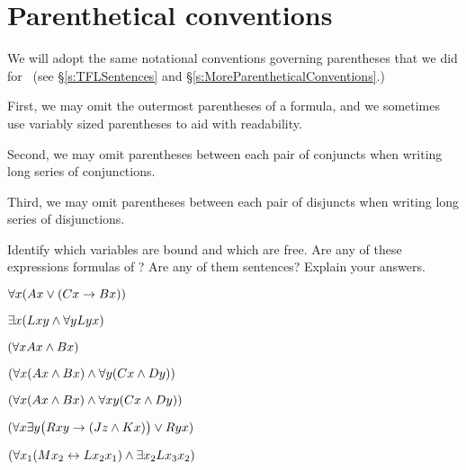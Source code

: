 \section{Parenthetical conventions}

We will adopt the same notational conventions governing parentheses that we did for \TFL\ (see §\ref{s:TFLSentences} and §\ref{s:MoreParentheticalConventions}.) 

First, we may omit the outermost parentheses of a formula, and we sometimes use variably sized parentheses to aid with readability.  

Second, we may omit parentheses between each pair of conjuncts when writing long series of conjunctions. 

Third, we may omit parentheses between each pair of disjuncts when writing long series of disjunctions.


\practiceproblems
\problempart
\label{pr.freeFOL}
Identify which variables are bound and which are free. Are any of these expressions formulas of \FOL? Are any of them sentences? Explain your answers.
\begin{earg}
\item $\forall x (Ax \vee (Cx \rightarrow Bx))$
\item $\exists x (Lxy \wedge \forall y Lyx)$
\item $(\forall x Ax \wedge Bx)$
\item $(\forall x (Ax \wedge Bx) \wedge \forall y(Cx \wedge Dy))$
\item $(\forall x (Ax \wedge Bx) \wedge \forall xy(Cx \wedge Dy))$
\item $(\forall x\exists y\bigl(Rxy \rightarrow (Jz \wedge Kx) \bigr) \vee Ryx)$
\item $(\forall x_{1}(Mx_{2} \leftrightarrow Lx_{2}x_{1}) \wedge \exists x_{2} Lx_{3}x_{2})$
\end{earg}


